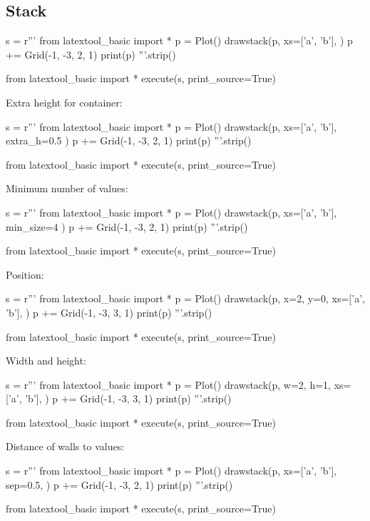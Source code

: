 \subsection{Stack}

\begin{python}
s = r'''
from latextool_basic import *
p = Plot()
drawstack(p,
  xs=['a', 'b'], 
  )
p += Grid(-1, -3, 2, 1)
print(p)
'''.strip()

from latextool_basic import *
execute(s, print_source=True)
\end{python}

\newpage
Extra height for container:
\begin{python}
s = r'''
from latextool_basic import *
p = Plot()
drawstack(p,
  xs=['a', 'b'],
  extra_h=0.5
  )
p += Grid(-1, -3, 2, 1)
print(p)
'''.strip()

from latextool_basic import *
execute(s, print_source=True)
\end{python}

\newpage
Minimum number of values:

\begin{python}
s = r'''
from latextool_basic import *
p = Plot()
drawstack(p,
  xs=['a', 'b'],
  min_size=4
  )
p += Grid(-1, -3, 2, 1)
print(p)
'''.strip()

from latextool_basic import *
execute(s, print_source=True)
\end{python}


\newpage
Position:

\begin{python}
s = r'''
from latextool_basic import *
p = Plot()
drawstack(p,
  x=2, y=0,
  xs=['a', 'b'],
  )
p += Grid(-1, -3, 3, 1)
print(p)
'''.strip()

from latextool_basic import *
execute(s, print_source=True)
\end{python}

\newpage
Width and height:

\begin{python}
s = r'''
from latextool_basic import *
p = Plot()
drawstack(p,
  w=2, h=1, 
  xs=['a', 'b'],
  )
p += Grid(-1, -3, 3, 1)
print(p)
'''.strip()

from latextool_basic import *
execute(s, print_source=True)
\end{python}




\newpage

Distance of walls to values:
\begin{python}
s = r'''
from latextool_basic import *
p = Plot()
drawstack(p,
  xs=['a', 'b'],
  sep=0.5, 
  )
p += Grid(-1, -3, 2, 1)
print(p)
'''.strip()

from latextool_basic import *
execute(s, print_source=True)
\end{python}


